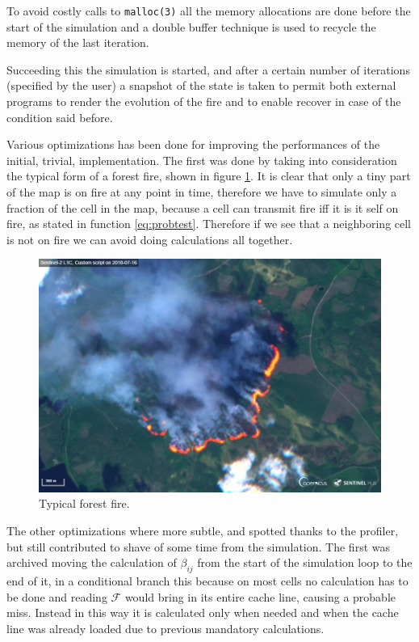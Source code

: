 \documentclass[Lau]{sapthesis} %
\begin{document}
To avoid costly calls to \texttt{malloc(3)} all the memory allocations are done
before the start of the simulation and a double buffer technique is used to
recycle the memory of the last iteration.

Succeeding this the simulation is started, and after a certain number of
iterations (specified by the user) a snapshot of the state is taken to permit
both external programs to render the evolution of the fire and to enable recover
in case of the condition said before.

Various optimizations has been done for improving the performances of the
initial, trivial, implementation. The first was done by taking into
consideration the typical form of a forest fire, shown in figure \ref{fig:fire}.
It is clear that only a tiny part of the map is on fire at any point in time,
therefore we have to simulate only a fraction of the cell in the map, because a
cell can transmit fire iff it is it self on fire, as stated in function
\ref{eq:probtest}. Therefore if we see that a neighboring cell is not on fire
we can avoid doing calculations all together.

\begin{figure}
\centering
\includegraphics[scale=0.2]{fire.jpg}
\caption{Typical forest fire.}
\label{fig:fire}
\end{figure}

The other optimizations where more subtle, and spotted thanks to the profiler,
but still contributed to shave of some time from the simulation. The first was
archived moving the calculation of $\beta_{ij}$ from the start of the simulation
loop to the end of it, in a conditional branch this because on most cells no
calculation has to be done and reading $\mathcal{F}$ would bring in its entire
cache line, causing a probable miss.  Instead in this way it is calculated only
when needed and when the cache line was already loaded due to previous mandatory
calculations.
\end{document}
